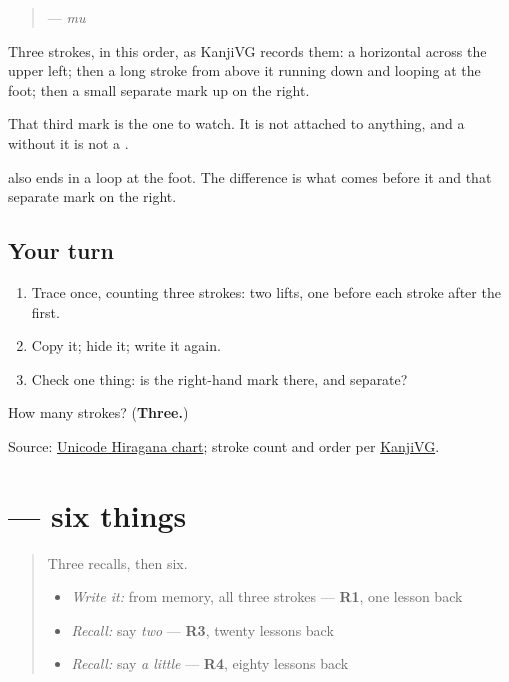 \begin{quote}
\textbf{} — \emph{mu}
\end{quote}

Three strokes, in this order, as KanjiVG records them: a horizontal across the upper left; then a long stroke from above it running down and looping at the foot; then a small separate mark up on the right.

That third mark is the one to watch. It is not attached to anything, and a \textbf{} without it is not a \textbf{}.

\textbf{} also ends in a loop at the foot. The difference is what comes before it and that separate mark on the right.

\subsection*{Your turn}
\begin{enumerate}
\raggedright
  \item Trace \textbf{} once, counting three strokes: two lifts, one before each stroke after the first.
  \item Copy it; hide it; write it again.
  \item Check one thing: is the right-hand mark there, and separate?
\end{enumerate}

\begin{tcolorbox}[breakable,colback=teal!4,colframe=teal!35!black,title={Before you move on}]
How many strokes? (\textbf{Three.})

Source: \href{https://www.unicode.org/charts/PDF/U3040.pdf}{Unicode Hiragana chart}; stroke count and order per \href{https://kanjivg.tagaini.net/kanjivg/kanji/03080.html}{KanjiVG}.
\end{tcolorbox}
\section[\texorpdfstring{\ja{むっつ} (muttsu)}{むっつ (muttsu)}]{ — six things}

\label{lesson:JA-C17-muttsu}



\begin{quote}
Three recalls, then six.

\begin{itemize}
\raggedright
  \item \emph{Write it:} \textbf{} from memory, all three strokes — \textbf{R1}, one lesson back
  \item \emph{Recall:} say \emph{two} — \textbf{R3}, twenty lessons back
  \item \emph{Recall:} say \emph{a little} — \textbf{R4}, eighty lessons back
\end{itemize}
\end{quote}

